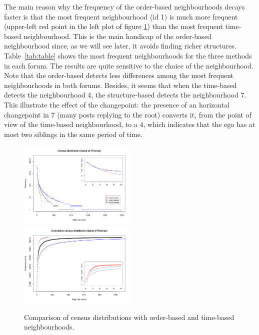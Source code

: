 \documentclass[conference]{IEEEtran}
\begin{document}
The main reason why the frequency of the order-based neighbourhoods decays faster is that the most frequent neighbourhood (id 1) is much more frequent (upper-left red point in the left plot of figure \ref{fig:census_distributions}) than the most frequent time-based neighbourhood. This is the main handicap of the order-based neighbourhood since, as we will see later, it avoids finding richer structures. Table~{\ref{tab:table}} shows the most frequent neighbourhoods for the three methods in each forum. The results are quite sensitive to the choice of the neighbourhood. Note that the order-based detects less differences among the most frequent neighbourhoods in both forums. Besides, it seems that when the time-based detects the neighbourhood 4, the structure-based detects the neighbourhood 7. This illustrate the effect of the changepoint: the presence of an horizontal changepoint in 7 (many posts replying to the root) converts it, from the point of view of the time-based neighbourhood, to a 4, which indicates that the ego has at most two siblings in the same period of time.

\begin{figure}
\centering
\includegraphics[width=0.5\textwidth]{compare_census_distribution_gameofthones}%
\includegraphics[width=0.5\textwidth]{compare_census_distribution_gameofthones_cum}
\caption{Comparison of census distributions with order-based and time-based neighbourhoods.}
\label{fig:census_distributions}
\end{figure}
\end{document}
